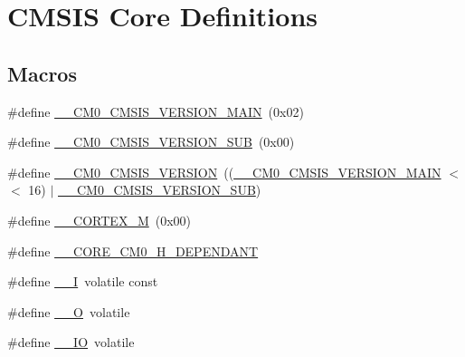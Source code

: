 \hypertarget{group___c_m_s_i_s__core__definitions}{}\section{C\+M\+S\+IS Core Definitions}
\label{group___c_m_s_i_s__core__definitions}
\subsection*{Macros}
\begin{DoxyCompactItemize}
\item 
\#define \hyperlink{group___c_m_s_i_s__core__definitions_gacd01bf0a654a7f15f606593aa636bc72}{\+\_\+\+\_\+\+C\+M0\+\_\+\+C\+M\+S\+I\+S\+\_\+\+V\+E\+R\+S\+I\+O\+N\+\_\+\+M\+A\+IN}~(0x02)
\item 
\#define \hyperlink{group___c_m_s_i_s__core__definitions_gab6a85b0d3b2fbcfb62003006ece175cc}{\+\_\+\+\_\+\+C\+M0\+\_\+\+C\+M\+S\+I\+S\+\_\+\+V\+E\+R\+S\+I\+O\+N\+\_\+\+S\+UB}~(0x00)
\item 
\#define \hyperlink{group___c_m_s_i_s__core__definitions_gaf233a7b7b2818cc6194e7a9386faccd8}{\+\_\+\+\_\+\+C\+M0\+\_\+\+C\+M\+S\+I\+S\+\_\+\+V\+E\+R\+S\+I\+ON}~((\hyperlink{group___c_m_s_i_s__core__definitions_gacd01bf0a654a7f15f606593aa636bc72}{\+\_\+\+\_\+\+C\+M0\+\_\+\+C\+M\+S\+I\+S\+\_\+\+V\+E\+R\+S\+I\+O\+N\+\_\+\+M\+A\+IN} $<$$<$ 16) $\vert$ \hyperlink{group___c_m_s_i_s__core__definitions_gab6a85b0d3b2fbcfb62003006ece175cc}{\+\_\+\+\_\+\+C\+M0\+\_\+\+C\+M\+S\+I\+S\+\_\+\+V\+E\+R\+S\+I\+O\+N\+\_\+\+S\+UB})
\item 
\#define \hyperlink{group___c_m_s_i_s__core__definitions_ga63ea62503c88acab19fcf3d5743009e3}{\+\_\+\+\_\+\+C\+O\+R\+T\+E\+X\+\_\+M}~(0x00)
\item 
\#define \hyperlink{group___c_m_s_i_s__core__definitions_gac1e2acb34ba7f2543bcb2249bead4aee}{\+\_\+\+\_\+\+C\+O\+R\+E\+\_\+\+C\+M0\+\_\+\+H\+\_\+\+D\+E\+P\+E\+N\+D\+A\+NT}
\item 
\#define \hyperlink{group___c_m_s_i_s__core__definitions_gaf63697ed9952cc71e1225efe205f6cd3}{\+\_\+\+\_\+I}~volatile const
\item 
\#define \hyperlink{group___c_m_s_i_s__core__definitions_ga7e25d9380f9ef903923964322e71f2f6}{\+\_\+\+\_\+O}~volatile
\item 
\#define \hyperlink{group___c_m_s_i_s__core__definitions_gaec43007d9998a0a0e01faede4133d6be}{\+\_\+\+\_\+\+IO}~volatile
\end{DoxyCompactItemize}


